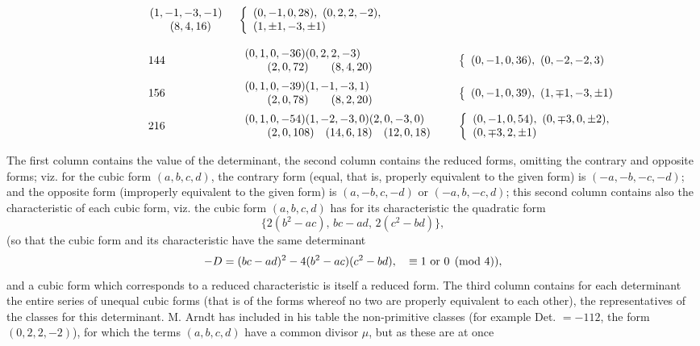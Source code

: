 ﻿\documentclass[11pt,a4paper]{article}
\theoremstyle{plain}
\theoremstyle{definition}
\begin{document}
\[\begin{array}{c@{\quad}l@{\qquad}l}
\begin{array}{l}
\hspace{5.2em}(1,-1,-3,-1)\\
\hspace{7.0em}(8,4,16)
\end{array}
&
\left\{\begin{array}{l}
(0,-1,0,28),\ (0,2,2,-2),\\
(1,\pm1,-3,\pm1)
\end{array}\right.\\[1.8em]
144&
\begin{array}{l}
(0,1,0,-36)(0,2,2,-3)\\
\qquad(2,0,72)\qquad(8,4,20)
\end{array}
&
\left\{\begin{array}{l}
(0,-1,0,36),\ (0,-2,-2,3)
\end{array}\right.\\[1.1em]
156&
\begin{array}{l}
(0,1,0,-39)(1,-1,-3,1)\\
\qquad(2,0,78)\qquad(8,2,20)
\end{array}
&
\left\{\begin{array}{l}
(0,-1,0,39),\ (1,\mp1,-3,\pm1)
\end{array}\right.\\[1.1em]
216&
\begin{array}{l}
(0,1,0,-54)(1,-2,-3,0)(2,0,-3,0)\\
\qquad(2,0,108)\quad(14,6,18)\quad(12,0,18)
\end{array}
&
\left\{\begin{array}{l}
(0,-1,0,54),\ (0,\mp3,0,\pm2),\\
(0,\mp3,2,\pm1)
\end{array}\right.
\end{array}
\]

The first column contains the value of the determinant, the second column
contains the reduced forms, omitting the contrary and opposite forms; viz.
for the cubic form \((a,b,c,d)\), the contrary form (equal, that is,
properly equivalent to the given form) is \((-a,-b,-c,-d)\); and the
opposite form (improperly equivalent to the given form) is
\((a,-b,c,-d)\) or \((-a,b,-c,d)\); this second column contains also the
characteristic of each cubic form, viz. the cubic form \((a,b,c,d)\) has
for its characteristic the quadratic form
\[
\{2(b^2-ac),\,bc-ad,\,2(c^2-bd)\},
\]
(so that the cubic form and its characteristic have the same determinant
\[
-D=(bc-ad)^2-4(b^2-ac)(c^2-bd),\quad \equiv 1\hbox{ or }0\pmod 4),
\]
and a cubic form which corresponds to a reduced characteristic is itself a
reduced form. The third column contains for each determinant the entire
series of unequal cubic forms (that is of the forms whereof no two are
properly equivalent to each other), the representatives of the classes for
this determinant. M. Arndt has included in his table the non-primitive
classes (for example Det. \(=-112\), the form \((0,2,2,-2)\)), for which
the terms \((a,b,c,d)\) have a common divisor \(\mu\), but as these are at
once
\end{document}
